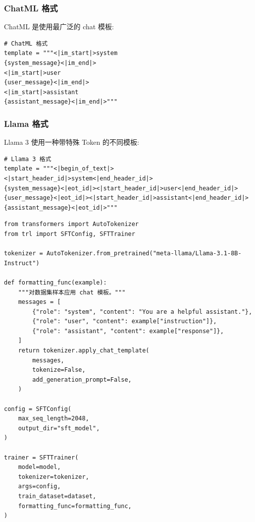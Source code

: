 \subsubsection*{ChatML 格式}
\label{chatml-format}

ChatML 是使用最广泛的 chat 模板:

\begin{lstlisting}[style=pythonstyle]
# ChatML 格式
template = """<|im_start|>system
{system_message}<|im_end|>
<|im_start|>user
{user_message}<|im_end|>
<|im_start|>assistant
{assistant_message}<|im_end|>"""
\end{lstlisting}

\subsubsection*{Llama 格式}
\label{llama-format}

Llama 3 使用一种带特殊 Token 的不同模板:

\begin{lstlisting}[style=pythonstyle]
# Llama 3 格式
template = """<|begin_of_text|><|start_header_id|>system<|end_header_id|>
{system_message}<|eot_id|><|start_header_id|>user<|end_header_id|>
{user_message}<|eot_id|><|start_header_id|>assistant<|end_header_id|>
{assistant_message}<|eot_id|>"""
\end{lstlisting}

\begin{examplebox}
\begin{lstlisting}[style=pythonstyle]
from transformers import AutoTokenizer
from trl import SFTConfig, SFTTrainer

tokenizer = AutoTokenizer.from_pretrained("meta-llama/Llama-3.1-8B-Instruct")

def formatting_func(example):
    """对数据集样本应用 chat 模板。"""
    messages = [
        {"role": "system", "content": "You are a helpful assistant."},
        {"role": "user", "content": example["instruction"]},
        {"role": "assistant", "content": example["response"]},
    ]
    return tokenizer.apply_chat_template(
        messages,
        tokenize=False,
        add_generation_prompt=False,
    )

config = SFTConfig(
    max_seq_length=2048,
    output_dir="sft_model",
)

trainer = SFTTrainer(
    model=model,
    tokenizer=tokenizer,
    args=config,
    train_dataset=dataset,
    formatting_func=formatting_func,
)
\end{lstlisting}
\end{examplebox}

